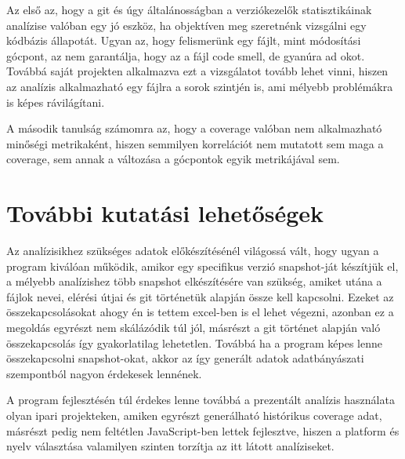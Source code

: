 Az első az, hogy a git és úgy általánosságban a verziókezelők statisztikáinak analízise valóban egy jó eszköz, ha objektíven meg szeretnénk vizsgálni egy kódbázis állapotát. Ugyan az, hogy felismerünk egy fájlt, mint módosítási gócpont, az nem garantálja, hogy az a fájl code smell, de gyanúra ad okot. Továbbá saját projekten alkalmazva ezt a vizsgálatot tovább lehet vinni, hiszen az analízis alkalmazható egy fájlra a sorok szintjén is, ami mélyebb problémákra is képes rávilágítani.

A második tanulság számomra az, hogy a coverage valóban nem alkalmazható minőségi metrikaként, hiszen semmilyen korrelációt nem mutatott sem maga a coverage, sem annak a változása a gócpontok egyik metrikájával sem.

\section{További kutatási lehetőségek}

Az analízisikhez szükséges adatok előkészítésénél világossá vált, hogy ugyan a program kiválóan működik, amikor egy specifikus verzió snapshot-ját készítjük el, a mélyebb analízishez több snapshot elkészítésére van szükség, amiket utána a fájlok nevei, elérési útjai és git történetük alapján össze kell kapcsolni. Ezeket az összekapcsolásokat ahogy én is tettem excel-ben is el lehet végezni, azonban ez a megoldás egyrészt nem skálázódik túl jól, másrészt a git történet alapján való összekapcsolás így gyakorlatilag lehetetlen. Továbbá ha a program képes lenne összekapcsolni snapshot-okat, akkor az így generált adatok adatbányászati szempontból nagyon érdekesek lennének.

A program fejlesztésén túl érdekes lenne továbbá a prezentált analízis használata olyan ipari projekteken, amiken egyrészt generálható histórikus coverage adat, másrészt pedig nem feltétlen JavaScript-ben lettek fejlesztve, hiszen a platform és nyelv választása valamilyen szinten torzítja az itt látott analíziseket.
